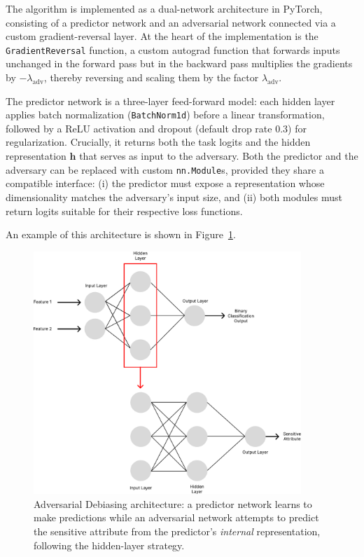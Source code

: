 \documentclass[12pt,a4paper,openright,twoside]{book}
\begin{document}
The algorithm is implemented as a dual-network architecture in PyTorch, consisting of a predictor network and an adversarial network connected via a custom gradient-reversal layer.  At the heart of the implementation is the \texttt{GradientReversal} function, a custom autograd function that forwards inputs unchanged in the forward pass but in the backward pass multiplies the gradients by $-\lambda_{\text{adv}}$, thereby reversing and scaling them by the factor $\lambda_{\text{adv}}$.  

The predictor network is a three-layer feed-forward model: each hidden layer applies batch normalization (\texttt{BatchNorm1d}) before a linear transformation, followed by a ReLU activation and dropout (default drop rate $0.3$) for regularization.  Crucially, it returns both the task logits and the hidden representation $\mathbf{h}$ that serves as input to the adversary.  Both the predictor and the adversary can be replaced with custom \texttt{nn.Module}s, provided they share a compatible interface: (i) the predictor must expose a representation whose dimensionality matches the adversary’s input size, and (ii) both modules must return logits suitable for their respective loss functions.

An example of this architecture is shown in Figure~\ref{fig:adversarial_debiasing}.
\begin{figure}
  \centering
  \includegraphics[width=0.9\textwidth]{figures/adversarial_debiasing.pdf}
  \caption{Adversarial Debiasing architecture: a predictor network learns to make predictions while an adversarial network attempts to predict the sensitive attribute from the predictor's \emph{internal} representation, following the hidden-layer strategy.}
  \label{fig:adversarial_debiasing}
\end{figure}
\end{document}
